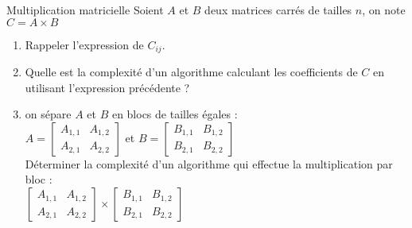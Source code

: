 \documentclass[10pt]{beamer}
\begin{document}
\begin{frame}[fragile]{\Ctitle}{\stitle}
	\begin{exampleblock}{Multiplication matricielle}
		Soient $A$ et $B$ deux matrices carrés de tailles $n$, on note $C = A\times B$
		\begin{enumerate}
			\item<2-> Rappeler l'expression de $C_{ij}$.
			\item<3-> Quelle est la complexité d'un algorithme calculant les coefficients de $C$ en utilisant l'expression précédente ?
			\item<4-> on sépare $A$ et $B$ en blocs de tailles égales : \\
			$A =
				\begin{bmatrix}
					A_{1,1} & A_{1,2} \\
					A_{2,1} & A_{2,2}
				\end{bmatrix}$ et
			$B =
				\begin{bmatrix}
					B_{1,1} & B_{1,2} \\
					B_{2,1} & B_{2,2}
				\end{bmatrix}$ \\
			Déterminer la complexité d'un algorithme qui effectue la multiplication par bloc : \\
			$\begin{bmatrix}
				A_{1,1} & A_{1,2} \\
				A_{2,1} & A_{2,2}
			\end{bmatrix} \times 
				\begin{bmatrix}
					B_{1,1} & B_{1,2} \\
					B_{2,1} & B_{2,2}
				\end{bmatrix}
			$ 
		\end{enumerate}
	\end{exampleblock}
\end{frame}
\end{document}

